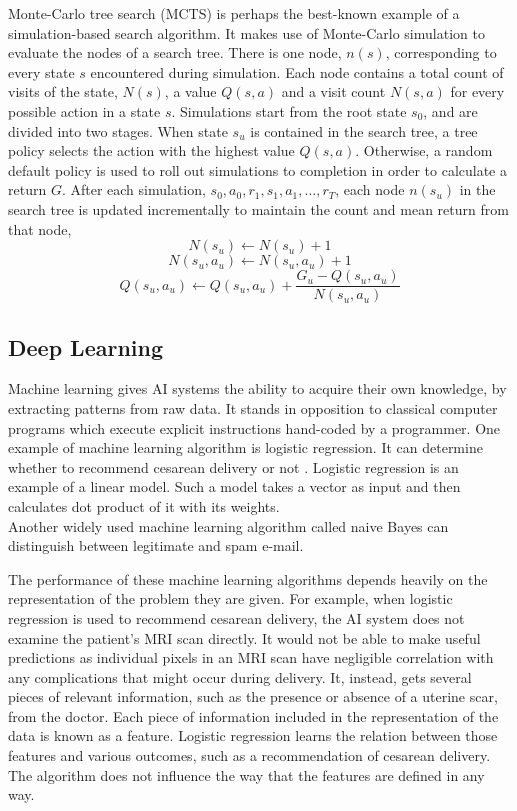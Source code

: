 Monte-Carlo tree search (MCTS) is perhaps the best-known example of a simulation-based search algorithm. It makes use of Monte-Carlo simulation to evaluate the nodes of a search tree. There is one node, $n(s)$, corresponding to every state $s$ encountered during simulation. Each node contains a total count of visits of the state, $N(s)$, a value $Q(s, a)$ and a visit count $N(s, a)$ for every possible action in a state $s$. Simulations start from the root state $s_0$, and are divided into two stages. When state $s_u$ is contained in the search tree, a tree policy selects the action with the highest value $Q(s, a)$. Otherwise, a random default policy is used to roll out simulations to completion in order to calculate a return $G$. After each simulation, $s_0, a_0, r_1, s_1, a_1, ..., r_T$, each node $n(s_u)$ in the search tree is updated incrementally to maintain the count and mean return from that node,
$$N(s_u) \leftarrow N(s_u) + 1$$
$$N(s_u, a_u) \leftarrow N(s_u, a_u) + 1$$
$$Q(s_u, a_u) \leftarrow Q(s_u, a_u) + \frac{G_u - Q(s_u, a_u)}{N(s_u, a_u)}$$

\subsection{Deep Learning}

Machine learning gives AI systems the ability to acquire their own knowledge, by extracting patterns from raw data. It stands in opposition to classical computer programs which execute explicit instructions hand-coded by a programmer.
One example of machine learning algorithm is logistic regression. It can determine whether to recommend cesarean delivery or not \cite{Study.Cesarean}. Logistic regression is an example of a linear model. Such a model takes a vector as input and then calculates dot product of it with its weights. \\
Another widely used machine learning algorithm called naive Bayes can distinguish between legitimate and spam e-mail.

The performance of these machine learning algorithms depends heavily on the representation of the problem they are given. For example, when logistic regression is used to recommend cesarean delivery, the AI system does not examine the patient's MRI scan directly. It would not be able to make useful predictions as individual pixels in an MRI scan have negligible correlation with any complications that might occur during delivery. It, instead, gets several pieces of relevant information, such as the presence or absence of a uterine scar, from the doctor. Each piece of information included in the representation of the data is known as a feature. Logistic regression learns the relation between those features and various outcomes, such as a recommendation of cesarean delivery. The algorithm does not influence the way that the features are defined in any way.


